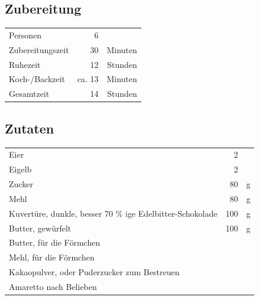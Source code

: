 \subsection*{Zubereitung}
\begin{tabular}{lrr}
	Personen         &       6 &         \\
	Zubereitungszeit &      30 & Minuten \\
	Ruhezeit         &      12 & Stunden \\
	Koch-/Backzeit   & ca.  13 & Minuten \\
	Gesamtzeit       &      14 & Stunden
\end{tabular} 

\subsection*{Zutaten}
\begin{tabular}{lrl}
	Eier                                                      &   2 &   \\
	Eigelb                                                    &   2 &   \\
	Zucker                                                    &  80 & g \\
	Mehl                                                      &  80 & g \\
	Kuvertüre, dunkle, besser 70 \% ige Edelbitter-Schokolade & 100 & g \\
	Butter, gewürfelt                                         & 100 & g \\
	Butter, für die Förmchen                                  &     &   \\
	Mehl, für die Förmchen                                    &     &   \\
	Kakaopulver, oder Puderzucker zum Bestreuen               &     &   \\
	Amaretto nach Belieben                                    &     &
\end{tabular} 


